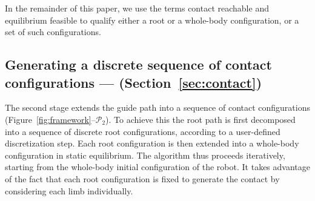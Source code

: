 
In the remainder of this paper, we use the terms \gls{contact reachable} and \gls{equilibrium feasible} to qualify either a root or a whole-body configuration, or a set
of such configurations.


\subsection{Generating a discrete sequence of contact configurations --- \Pb (Section~\ref{sec:contact})}
The second stage extends the guide path into a sequence of contact configurations (Figure~\ref{fig:framework}--$\mathcal{P}_2$).
To achieve this the root path is first decomposed into a sequence of discrete root configurations, according to a user-defined discretization step.
Each root configuration is then extended into a whole-body configuration in static equilibrium.
The algorithm thus proceeds iteratively, starting from the whole-body initial configuration of the robot.
It takes advantage of the fact that each root configuration is fixed to generate the contact by considering each limb individually. 




